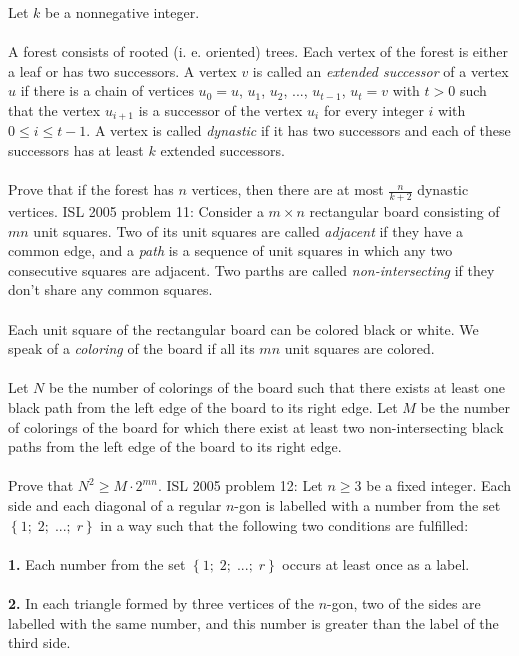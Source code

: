Let $k$ be a nonnegative integer. \\\\
A forest consists of rooted (i. e. oriented) trees. Each vertex of the forest is either a leaf or has two successors. A vertex $v$ is called an \textit{extended successor} of a vertex $u$ if there is a chain of vertices $u_0=u$, $u_1$, $u_2$, ..., $u_{t-1}$, $u_t=v$ with $t>0$ such that the vertex $u_{i+1}$ is a successor of the vertex $u_i$ for every integer $i$ with $0\leq i\leq t-1$. A vertex is called \textit{dynastic} if it has two successors and each of these successors has at least $k$ extended successors. \\\\
Prove that if the forest has $n$ vertices, then there are at most $\frac{n}{k+2}$ dynastic vertices. 
ISL 2005 problem 11:  Consider a $m\times n$ rectangular board consisting of $mn$ unit squares. Two of its unit squares are called \textit{adjacent} if they have a common edge, and a \textit{path} is a sequence of unit squares in which any two consecutive squares are adjacent. Two parths are called \textit{non-intersecting} if they don't share any common squares. \\\\
Each unit square of the rectangular board can be colored black or white. We speak of a \textit{coloring} of the board if all its $mn$ unit squares are colored. \\\\
Let $N$ be the number of colorings of the board such that there exists at least one black path from the left edge of the board to its right edge. Let $M$ be the number of colorings of the board for which there exist at least two non-intersecting black paths from the left edge of the board to its right edge. \\\\
Prove that $N^2\geq M\cdot 2^{mn}$. 
ISL 2005 problem 12:  Let $n\geq 3$ be a fixed integer. Each side and each diagonal of a regular $n$-gon is labelled with a number from the set $\left\{1;\;2;\;...;\;r\right\}$ in a way such that the following two conditions are fulfilled: \\\\
\textbf{1.} Each number from the set $\left\{1;\;2;\;...;\;r\right\}$ occurs at least once as a label. \\\\
\textbf{2.} In each triangle formed by three vertices of the $n$-gon, two of the sides are labelled with the same number, and this number is greater than the label of the third side. \\\\
